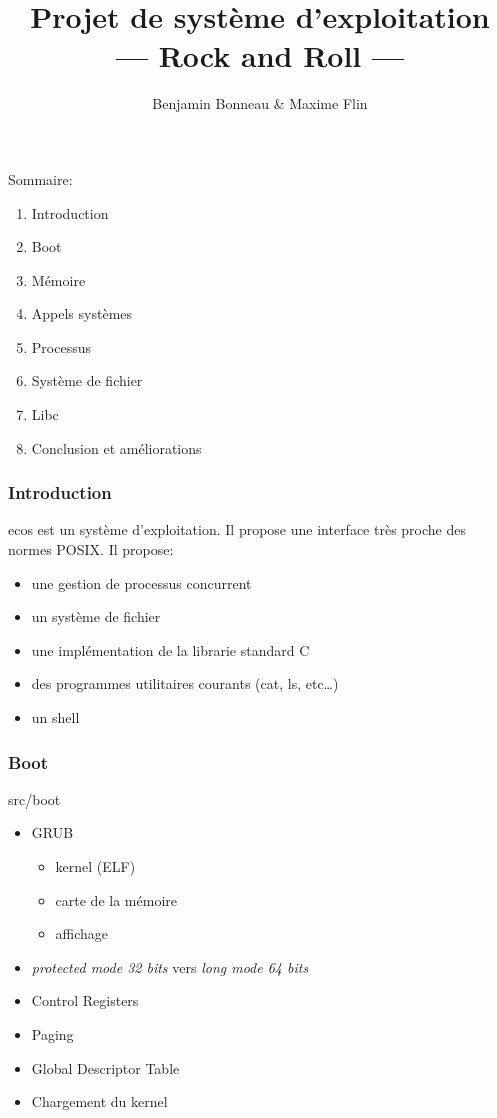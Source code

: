 \documentclass[10pt,a4paper]{beamer}
\author{Benjamin Bonneau \& Maxime Flin }
\title{Projet de système d'exploitation \\ --- Rock and Roll ---}
\begin{document}
\maketitle

\begin{frame}
  Sommaire:
  \begin{enumerate}
  \item Introduction
  \item Boot
  \item Mémoire
  \item Appels systèmes
  \item Processus
  \item Système de fichier
  \item Libc
  \item Conclusion et améliorations
  \end{enumerate}
\end{frame}

\begin{frame}
  \frametitle{Introduction}
  \textrm{ecos} est un système d'exploitation. Il propose une interface très proche des normes \textrm{POSIX}. Il propose:
  \begin{itemize}
  \item une gestion de processus concurrent
  \item un système de fichier
  \item une implémentation de la librarie standard C
  \item des programmes utilitaires courants (\textrm{cat}, \textrm{ls}, etc\ldots)
  \item un shell
  \end{itemize}
\end{frame}

\begin{frame}
	\frametitle{Boot}
	\textrm{src/boot}

	\begin{itemize}
		\item GRUB
			\begin{itemize}
				\item kernel (ELF)
				\item carte de la mémoire
				\item affichage
			\end{itemize}
		\item \textit{protected mode 32 bits} vers \textit{long mode 64 bits}
		\item Control Registers
		\item Paging
		\item Global Descriptor Table
		\item Chargement du kernel
	\end{itemize}
\end{frame}
\end{document}
